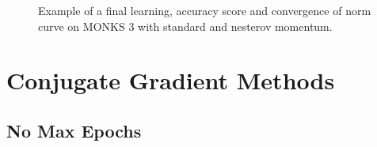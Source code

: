 \begin{appendices}
\begin{figure}[H]
\begin{subfigure}{0.40\textwidth}
                    \caption{}
                    \label{fig:monks_3_ACC_SGD}
                \end{subfigure}
                \begin{subfigure}{0.40\textwidth}
                    \caption{}
                    \label{fig:monks_3_NORM_SGD}
                \end{subfigure}
                \caption{Example of a final learning, accuracy score and convergence of norm curve on MONKS 3 with standard and nesterov momentum.}
                \label{fig:monks_3_SGD}
            \end{figure}


         \section{Conjugate Gradient Methods} %
         \label{sec:conjugate_gradient_methods}
            \subsection{No Max Epochs} %
            \label{sub:comparisons}


\end{appendices}
